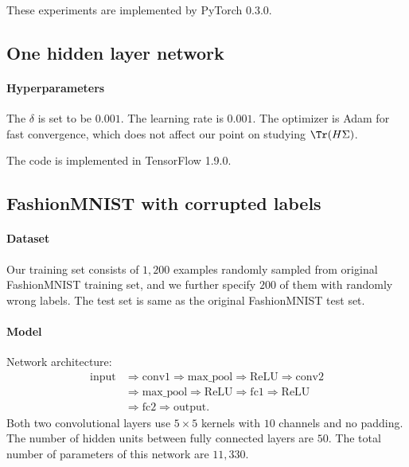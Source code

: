 \documentclass{article}
\begin{document}
These experiments are implemented by PyTorch $0.3.0$.

\subsection{One hidden layer network}
\paragraph{Hyperparameters}
The $\delta$ is set to be $0.001$.
The learning rate is $0.001$.
The optimizer is Adam for fast convergence, which does not affect our point on studying $\Tr (H\Sigma)$.

The code is implemented in TensorFlow 1.9.0.

\subsection{FashionMNIST with corrupted labels}
\label{sec:mnistsetup}
\paragraph{Dataset}
Our training set consists of $1,200$ examples randomly sampled from original FashionMNIST training set, and we further specify $200$ of them with randomly wrong labels. The test set is same as the original FashionMNIST test set.

\paragraph{Model}
Network architecture:
\begin{align*}
    \text{input} &\Rightarrow \text{conv1} \Rightarrow \text{max\_pool} \Rightarrow \text{ReLU} \Rightarrow \text{conv2} \\
    &\Rightarrow \text{max\_pool} \Rightarrow \text{ReLU}
    \Rightarrow \text{fc1} \Rightarrow \text{ReLU} \\
    &\Rightarrow \text{fc2} \Rightarrow \text{output}.
\end{align*}
Both two convolutional layers use $5\times 5$ kernels with $10$ channels and no padding. The number of hidden units between fully connected layers are $50$. The total number of parameters of this network are $11,330$.
\end{document}
